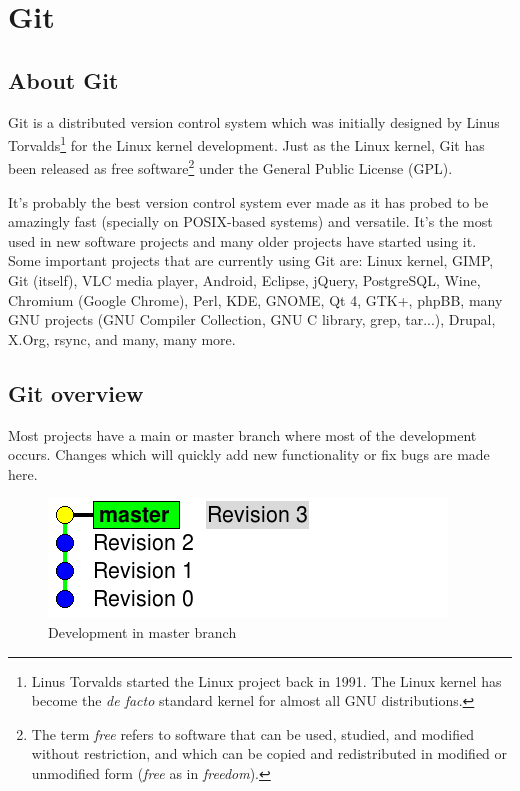 \documentclass[a4paper,10pt]{article}
\begin{document}
\section{Git}

\subsection{About Git}

Git is a distributed version control system which was initially designed
by Linus Torvalds\footnote{Linus Torvalds started the Linux project back
in 1991. The Linux kernel has become the \textit{de facto} standard
kernel for almost all GNU distributions.} for the Linux kernel
development. Just as the Linux kernel, Git has been released as free
software\footnote{The term \textit{free} refers to software that can be
used, studied, and modified without restriction, and which can be copied
and redistributed in modified or unmodified form (\textit{free} as in
\textit{freedom}).} under the General Public License (GPL).

It's probably the best version control system ever made as it has probed
to be amazingly fast (specially on POSIX-based systems) and versatile.
It's the most used in new software projects and many older projects have
started using it. Some important projects that are currently using Git
are:
Linux kernel,
GIMP,
Git (itself),
VLC media player,
Android,
Eclipse,
jQuery,
PostgreSQL,
Wine,
Chromium (Google Chrome),
Perl,
KDE,
GNOME,
Qt 4,
GTK+,
phpBB,
many GNU projects (GNU Compiler Collection, GNU C library, grep, tar...),
Drupal,
X.Org,
rsync,
and many, many more.

\subsection{Git overview}

Most projects have a main or master branch where most of the development
occurs. Changes which will quickly add new functionality or fix bugs are
made here.

\begin{figure}[h]
  \begin{center}
    \includegraphics[scale=0.5]{branching-00}
  \end{center}
  \caption{Development in master branch}
\end{figure}
\end{document}
